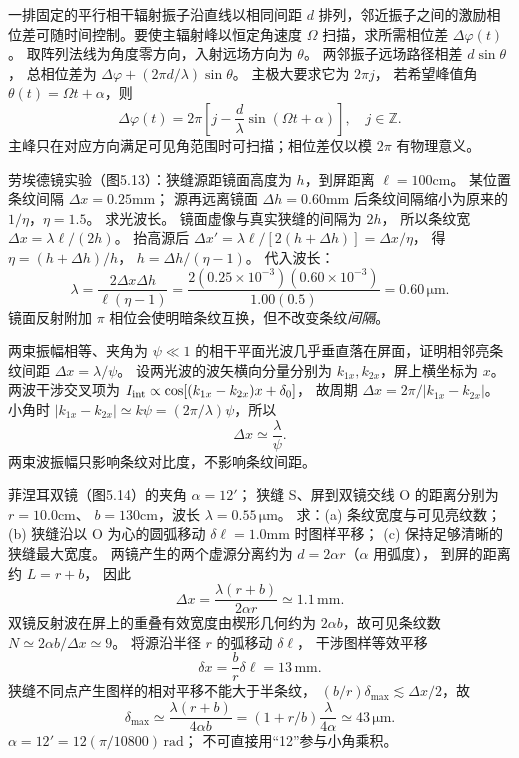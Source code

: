 一排固定的平行相干辐射振子沿直线以相同间距 $d$ 排列，邻近振子之间的激励相位差可随时间控制。要使主辐射峰以恒定角速度 $\Omega$ 扫描，求所需相位差 $\Delta\varphi(t)$。
\exsolution
取阵列法线为角度零方向，入射远场方向为 $\theta$。
两邻振子远场路径相差 $d\sin\theta$，
总相位差为
$\Delta\varphi+(2\pi d/\lambda)\sin\theta$。
主极大要求它为 $2\pi j$，
若希望峰值角
$\theta(t)=\Omega t+\alpha$，则
\[
\boxed{\Delta\varphi(t)=2\pi
\left[j-\frac d\lambda\sin(\Omega t+\alpha)\right]},
\quad j\in\mathbb Z.
\]
\excheck 主峰只在对应方向满足可见角范围时可扫描；相位差仅以模 $2\pi$ 有物理意义。

劳埃德镜实验（图5.13）：狭缝源距镜面高度为 $h$，到屏距离
$\ell=100$cm。
某位置条纹间隔 $\Delta x=0.25$mm；
源再远离镜面 $\Delta h=0.60$mm 后条纹间隔缩小为原来的 $1/\eta$，$\eta=1.5$。
求光波长。
\exsolution
镜面虚像与真实狭缝的间隔为 $2h$，
所以条纹宽
$\Delta x=\lambda\ell/(2h)$。
抬高源后
$\Delta x'=\lambda\ell/[2(h+\Delta h)]
=\Delta x/\eta$，
得
$\eta=(h+\Delta h)/h$，
$h=\Delta h/(\eta-1)$。
代入波长：
\[
\boxed{\lambda=
\frac{2\Delta x\Delta h}{\ell(\eta-1)}
=\frac{2(0.25\times10^{-3})(0.60\times10^{-3})}
{1.00(0.5)}
=0.60\,\mathrm{\mu m}}.
\]
\excheck 镜面反射附加 $\pi$ 相位会使明暗条纹互换，但不改变条纹\emph{间隔}。

两束振幅相等、夹角为 $\psi\ll1$ 的相干平面光波几乎垂直落在屏面，证明相邻亮条纹间距 $\Delta x=\lambda/\psi$。
\exsolution
设两光波的波矢横向分量分别为
$k_{1x},k_{2x}$，屏上横坐标为 $x$。
两波干涉交叉项为
$I_{\rm int}\propto\cos[(k_{1x}-k_{2x})x+\delta_0]$，
故周期
$\Delta x=2\pi/|k_{1x}-k_{2x}|$。
小角时
$|k_{1x}-k_{2x}|\simeq k\psi=(2\pi/\lambda)\psi$，所以
\[
\boxed{\Delta x\simeq\frac{\lambda}{\psi}}.
\]
\excheck 两束波振幅只影响条纹对比度，不影响条纹间距。

菲涅耳双镜（图5.14）的夹角 $\alpha=12'$；
狭缝 S、屏到双镜交线 O 的距离分别为 $r=10.0$cm、
$b=130$cm，波长 $\lambda=0.55\,\mathrm{\mu m}$。
求：(a) 条纹宽度与可见亮纹数；
(b) 狭缝沿以 O 为心的圆弧移动 $\delta\ell=1.0$mm 时图样平移；
(c) 保持足够清晰的狭缝最大宽度。
\exsolution
两镜产生的两个虚源分离约为
$d=2\alpha r$（$\alpha$ 用弧度），
到屏的距离约 $L=r+b$，
因此
\[
\boxed{\Delta x=\frac{\lambda(r+b)}{2\alpha r}
\simeq1.1\,\mathrm{mm}}.
\]
双镜反射波在屏上的重叠有效宽度由楔形几何约为
$2\alpha b$，故可见条纹数
$N\simeq 2\alpha b/\Delta x\simeq9$。
将源沿半径 $r$ 的弧移动 $\delta\ell$，
干涉图样等效平移
\[
\boxed{\delta x=\frac br\delta\ell
=13\,\mathrm{mm}}.
\]
狭缝不同点产生图样的相对平移不能大于半条纹，
$(b/r)\delta_{\max}\lesssim\Delta x/2$，故
\[
\boxed{\delta_{\max}\simeq
\frac{\lambda(r+b)}{4\alpha b}
=(1+r/b)\frac{\lambda}{4\alpha}
\simeq43\,\mathrm{\mu m}}.
\]
\excheck $\alpha=12'=12(\pi/10800)\,\mathrm{rad}$；
不可直接用“12”参与小角乘积。

